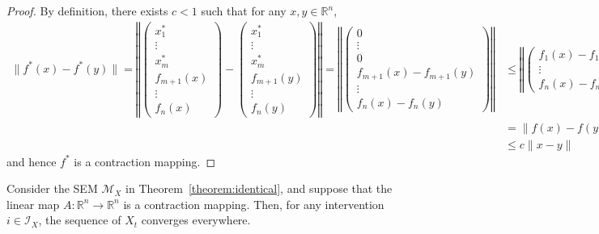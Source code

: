 \begin{proof}
By definition, there exists $c < 1$ such that for any $x,y\in \mathbb{R}^n$,
\begin{align*}
\| f^*(x) - f^*(y) \| =
\left\Vert
\begin{pmatrix}x^*_1\\ \vdots \\ x^*_m \\ f_{m+1}(x) \\ \vdots \\ f_n(x) \end{pmatrix} - \begin{pmatrix}x^*_1\\ \vdots \\ x^*_m \\ f_{m+1}(y) \\ \vdots \\ f_n(y) \end{pmatrix} \right\Vert =
\left\Vert
\begin{pmatrix} 0 \\ \vdots \\ 0 \\ f_{m+1}(x) - f_{m+1}(y) \\ \vdots \\ f_{n}(x) - f_n(y) \end{pmatrix} \right\Vert &\leq
\left\Vert
\begin{pmatrix} f_{1}(x) - f_1(y)  \\ \vdots \\ f_{n}(x) - f_n(y) \end{pmatrix} \right\Vert \\
& = \| f(x)-f(y) \|    \\
&\leq c \| x - y \|
\end{align*}
and hence $f^*$ is a contraction mapping.
\end{proof}

\medskip


\begin{lemma}\label{lemma:contraction_convergence}
Consider the SEM $\mathcal{M}_X$ in Theorem~\ref{theorem:identical}, and suppose that the linear map $A:\mathbb{R}^n \to \mathbb{R}^n$ is a contraction mapping.
Then, for any intervention $i\in\mathcal{I}_X$, the sequence of $X_t$ converges everywhere.
\end{lemma}

\medskip

